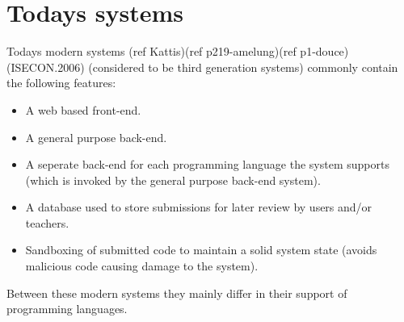 \section{Todays systems} \label{sec:todays_systems}
Todays modern systems (ref Kattis)(ref p219-amelung)(ref p1-douce)(ISECON.2006) (considered to be third generation systems) commonly contain the following features:
\begin{itemize}
	\item A web based front-end.
	\item A general purpose back-end.
	\item A seperate back-end for each programming language the system supports (which is invoked by the general purpose back-end system).
	\item A database used to store submissions for later review by users and/or teachers.
	\item Sandboxing of submitted code to maintain a solid system state (avoids malicious code causing damage to the system). 
\end{itemize}
Between these modern systems they mainly differ in their support of programming languages.